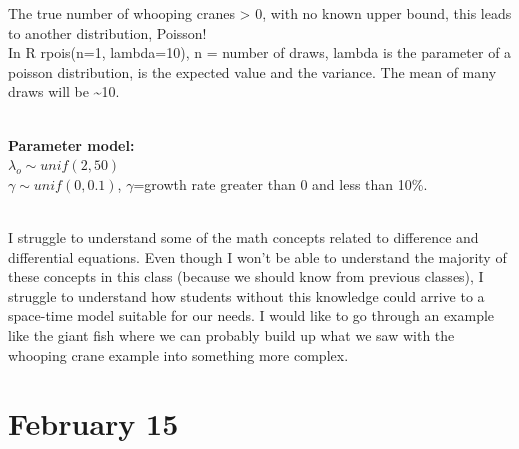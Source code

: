 \documentclass[
]{book}
\begin{document}
The true number of whooping cranes \textgreater{} 0, with no known upper bound, this leads to another distribution, Poisson!\\
In R rpois(n=1, lambda=10), n = number of draws, lambda is the parameter of a poisson distribution, is the expected value and the variance. The mean of many draws will be \textasciitilde10.\\
\strut \\
\textbf{Parameter model:}\\
\(\lambda_o \sim unif(2, 50)\)\\
\(\gamma \sim unif(0,0.1)\), \(\gamma\)=growth rate greater than 0 and less than 10\%.\\
\strut \\
I struggle to understand some of the math concepts related to difference and differential equations. Even though I won't be able to understand the majority of these concepts in this class (because we should know from previous classes), I struggle to understand how students without this knowledge could arrive to a space-time model suitable for our needs. I would like to go through an example like the giant fish where we can probably build up what we saw with the whooping crane example into something more complex.

\hypertarget{february-15}{%
\section{February 15}\label{february-15}}
\end{document}
